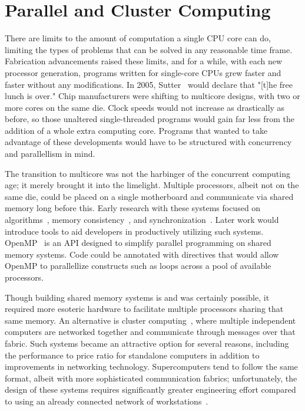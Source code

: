 \section{Parallel and Cluster Computing}

There are limits to the amount of computation a single CPU core can do,
limiting the types of problems that can be solved in any reasonable time
frame. Fabrication advancements raised these limits, and for a while,
with each new processor generation, programs written for single-core
CPUs grew faster and faster without any modifications. In 2005,
Sutter~\cite{free_lunch} would declare that "[t]he free lunch is over."
Chip manufacturers were shifting to multicore designs, with two or more
cores on the same die. Clock speeds would not increase as drastically
as before, so those unaltered single-threaded programs would gain far
less from the addition of a whole extra computing core. Programs that
wanted to take advantage of these developments would have to be structured
with concurrency and parallellism in mind.

The transition to multicore was not the harbinger of the
concurrent computing age; it merely brought it into the
limelight. Multiple processors, albeit not on the same die,
could be placed on a single motherboard and communicate via shared
memory long before this. Early research with these systems focused on
algorithms~\cite{sm_algorithms}, memory consistency~\cite{sm_consistency},
and synchronization~\cite{sm_sync}. Later work would
introduce tools to aid developers in productively utilizing such
systems. OpenMP~\cite{openmp} is an API designed to simplify parallel
programming on shared memory systems. Code could be annotated with
directives that would allow OpenMP to parallellize constructs such as
loops across a pool of available processors.

Though building shared memory systems is and was certainly
possible, it required more esoteric hardware to facilitate multiple
processors sharing that same memory. An alternative is cluster
computing~\cite{cluster_computing}, where multiple independent computers
are networked together and communicate through messages over that fabric.
Such systems became an attractive option for several reasons, including
the performance to price ratio for standalone computers in addition to
improvements in networking technology. Supercomputers tend to follow
the same format, albeit with more sophisticated communication fabrics;
unfortunately, the design of these systems requires significantly greater
engineering effort compared to using an already connected network of
workstations~\cite{berkeley_now}.

